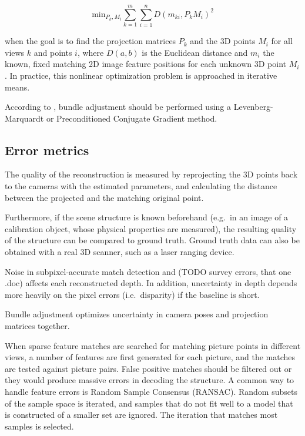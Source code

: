 \begin{equation}
	\text{min}_{P_k, M_i} \sum_{k=1}^m \sum_{i=1}^n D(m_{ki}, P_k M_i)^2
\end{equation}

when the goal is to find the projection matrices $P_k$ and the 3D points $M_i$ for all views $k$ and points $i$, where $D(a,b)$ is the Euclidean distance and $m_i$ the known, fixed matching 2D image feature positions for each unknown 3D point $M_i$.
In practice, this nonlinear optimization problem is approached in iterative means.

According to \cite{wu2013towards}, bundle adjustment should be performed using a Levenberg-Marquardt or Preconditioned Conjugate Gradient method.



\subsection{Error metrics} %

The quality of the reconstruction is measured by reprojecting the 3D points back to the cameras with the estimated parameters, and calculating the distance between the projected and the matching original point. \cite{hartley03multiview}

Furthermore, if the scene structure is known beforehand (e.g.\ in an image of a calibration object, whose physical properties are measured), the resulting quality of the structure can be compared to ground truth.
Ground truth data can also be obtained with a real 3D scanner, such as a laser ranging device. %

Noise in subpixel-accurate match detection and (TODO survey errors, that one .doc) affects each reconstructed depth.
In addition, uncertainty in depth depends more heavily on the pixel errors (i.e.\ disparity) if the baseline is short.


Bundle adjustment optimizes uncertainty in camera poses and projection matrices together.

When sparse feature matches are searched for matching picture points in different views, a number of features are first generated for each picture, and the matches are tested against picture pairs.
False positive matches should be filtered out or they would produce massive errors in decoding the structure. \cite{jotainsiftausta}
A common way to handle feature errors is Random Sample Consensus (RANSAC).
Random subsets of the sample space is iterated, and samples that do not fit well to a model that is constructed of a smaller set are ignored.
The iteration that matches most samples is selected. \cite{hartley03multiview}

